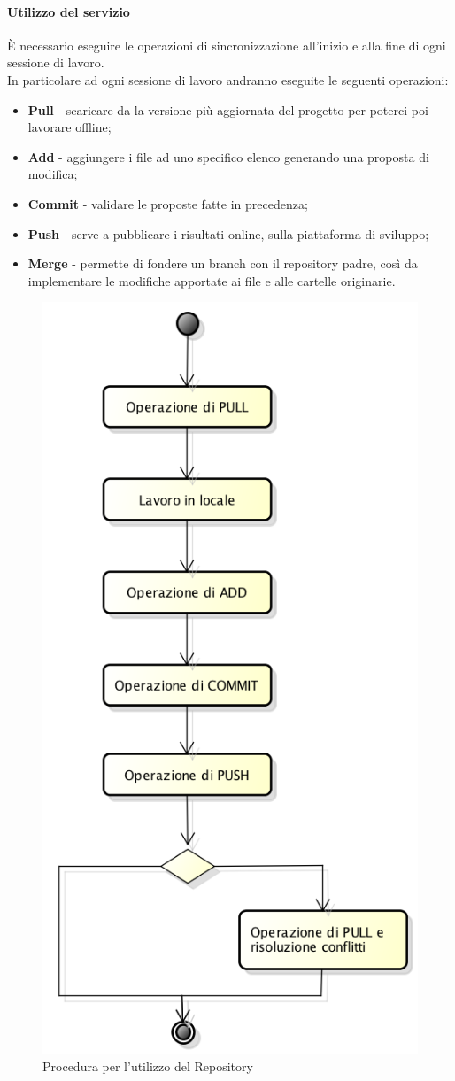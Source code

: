 \paragraph{Utilizzo del servizio}
È necessario eseguire le operazioni di sincronizzazione all'inizio e alla fine di ogni sessione di lavoro. \\
In particolare ad ogni sessione di lavoro andranno eseguite le seguenti operazioni:
\begin{itemize}
	\item \textbf{Pull} - scaricare da la versione più aggiornata del progetto per poterci poi lavorare offline;
	\item \textbf{Add} - aggiungere i file ad uno specifico elenco generando una proposta di modifica;
	\item \textbf{Commit} - validare le proposte fatte in precedenza;
	\item \textbf{Push} - serve a pubblicare i risultati online, sulla piattaforma di sviluppo;
	\item \textbf{Merge} - permette di fondere un \gls{branch} con il \gls{repository} padre, così da implementare le modifiche apportate ai file e alle cartelle originarie.
\end{itemize}
\begin{figure}[h]
\centering
\includegraphics[width=0.5\linewidth]{img/proceduraRepository}
\caption[Procedura per l'utilizzo del Repository]{Procedura per l'utilizzo del Repository}
\label{fig:proceduraRepository}
\end{figure}


